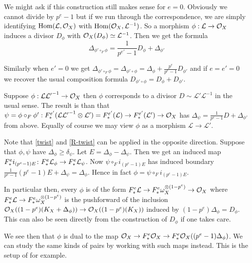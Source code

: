 \begin{remark}\label{R-twist}

We might ask if this construction still makes sense for $e=0$. Obviously we cannot divide by $p^{e}-1$ but if we run through the correspondence, we are simply identifying $\textup{Hom}(\mathcal{L},\mathcal{O}_{X})$ with $\textup{Hom}(\mathcal{O}_{X},\mathcal{L}^{-1})$. So a morphism $\phi: \mathcal{L} \to \mathcal{O}_{X}$ induces a divisor $D_{\phi}$ with $\mathcal{O}_{X}(D_{\phi})\simeq \mathcal{L}^{-1}$. Then we get the formula
\[\Delta_{\phi' \circ_{F} \phi}= \frac{1}{p^{e'}-1}D_{\phi} + \Delta_{\phi'}\]

Similarly when $e'=0$ we get $\Delta_{\phi' \circ_{F} \phi}=\Delta_{\phi' \circ \phi}=\Delta_{\phi} + \frac{p^{e}}{p^{e}-1}D_{\phi'}$ and if $e=e'=0$ we recover the usual composition formula $D_{\phi' \circ \phi}=D_{\phi} + D_{\phi'}$.

Suppose $\phi: \mathcal{L}\mathcal{L'}^{-1} \to \mathcal{O}_{X}$ then $\phi$ corresponds to a divisor $D\sim \mathcal{L'}\mathcal{L}^{-1}$ in the usual sense. The result is than that $\psi=\phi \circ_{F} \phi': F_{*}^{e'}(\mathcal{L}\mathcal{L'}^{-1} \otimes \mathcal{L'})=F_{*}^{e'}(\mathcal{L}) \to F_{*}^{e'}(\mathcal{L'})\to\mathcal{O}_{X}$ has $\Delta_{\psi}=\frac{1}{p^{e}-1}D+\Delta_{\phi'}$ from above. Equally of course we may view $\phi$ as a morphism $\mathcal{L} \to \mathcal{L'}$. 

\end{remark}

Note that \autoref{twist} and \autoref{R-twist} can be applied in the opposite direction. Suppose that $\phi,\psi$ have $\Delta_{\phi} \geq \delta_{\psi}$. Let $E=\Delta_{\phi}-\Delta_{\psi}$. Then we get an induced map $F^{e}_{*} i_{(p^{e}-1)E} \colon F^{e}_{*} \mathcal{L}_{\phi} \to F^{e}_{*} \mathcal{L}_{\psi}$. Now $\psi \circ_{F} i_{(p^{e}-1)E}$ has induced boundary $\frac{1}{p^{e}-1}(p^{e}-1)E+\Delta_{\psi}=\Delta_{\phi}$. Hence in fact $\phi=\psi \circ_{F} i_{(p^{e}-1)E}$.

In particular then, every $\phi$ is of the form $F^{e}_{*} \mathcal{L} \to F^{e}_{*} \omega_{X}^{\otimes(1-p^{e})} \to \mathcal{O}_{X}$ where $F^{e}_{*} \mathcal{L} \to F^{e}_{*} \omega_{X}^{\otimes(1-p^{e})}$ is the pushforward of the inclusion $\mathcal{O}_{X}((1-p^{e})(K_{X}+\Delta_{\phi})) \to \mathcal{O}_{X}((1-p^{e})(K_{X}))$ induced by $(1-p^{e})\Delta_{\phi}=D_{\phi}$. This can also be seen directly from the construction of $D_{\phi}$ if one takes care.

We see then that $\phi$ is dual to the map $\mathcal{O}_{X} \to F^{e}_{*}\mathcal{O}_{X} \to F^{e}_{*}\mathcal{O}_{X}((p^{e}-1)\Delta_{\phi})$. We can study the same kinds of pairs by working with such maps instead. This is the setup of \cite{schwede2010globally} for example.



